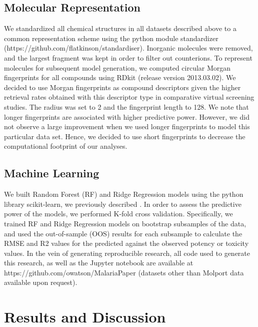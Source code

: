 \documentclass{article}
\begin{document}
\subsection{Molecular Representation}
We standardized all chemical structures in all datasets described above to a common representation scheme using the python module standardizer (https://github.com/flatkinson/standardiser). Inorganic molecules were removed, and the largest fragment was kept in order to filter out counterions. 
To represent molecules for subsequent model generation, we computed circular Morgan fingerprints\cite{Rogers2010} for all compounds using RDkit (release version 2013.03.02)\cite{rdkit}. We decided to use Morgan fingerprints as compound descriptors given the higher retrieval rates obtained with this descriptor type in comparative virtual screening studies\cite{Koutsoukas2013}. The radius was set to 2 and the fingerprint length to 128. We note that longer fingerprints are associated with higher predictive power. However, we did not observe a large improvement when we used longer fingerprints to model this particular data set. Hence, we decided to use short fingerprints to decrease the computational footprint of our analyses. 

\subsection{Machine Learning}
We built Random Forest (RF) and Ridge Regression models using the python library scikit-learn\cite{scikit}, we previously described \citep{et1:}.
In order to assess the predictive power of the models, we performed K-fold cross validation. Specifically, 
we trained RF and Ridge Regression models on bootstrap subsamples of the data, and used the out-of-sample (OOS) results for each subsample to calculate the RMSE and R2 values for the predicted against the observed potency or toxicity values.
In the vein of generating reproducible research\cite{Walters2013,Landrum2012}, all code used to generate this research, as well as the Jupyter notebook are available at https://github.com/owatson/MalariaPaper (datasets other than Molport data available upon request).




\section{Results and Discussion}
\end{document}
